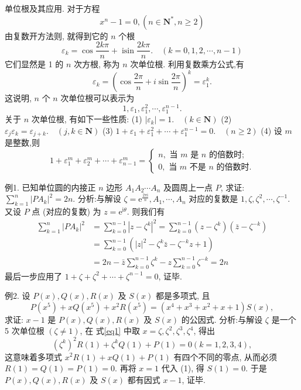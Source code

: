 
单位根及其应用.
对于方程
$$
x^n-1=0,\left(n \in \mathbf{N}^*, n \geqslant 2\right)
$$
由复数开方法则, 就得到它的 $n$ 个根
$$
\varepsilon_k=\cos \frac{2 k \pi}{n}+\operatorname{isin} \frac{2 k \pi}{n} . \quad(k=0,1,2, \cdots, n-1)
$$
它们显然是 1 的 $n$ 次方根, 称为 $n$ 次单位根.
利用复数乘方公式,有
$$
\varepsilon_k=\left(\cos \frac{2 \pi}{n}+i \sin \frac{2 \pi}{n}\right)^k=\varepsilon_1^k .
$$
这说明, $n$ 个 $n$ 次单位根可以表示为
$$
1, \varepsilon_1, \varepsilon_1^2, \cdots, \varepsilon_1^{n-1} .
$$
关于 $n$ 次单位根, 有如下一些性质:
(1) $\left|\varepsilon_k\right|=1 . \quad(k \in \mathbf{N})$
(2) $\varepsilon_j \varepsilon_k=\varepsilon_{j+k} . \quad(j, k \in \mathbf{N})$
(3) $1+\varepsilon_1+\varepsilon_1^2+\cdots+\varepsilon_1^{n-1}=0 . \quad(n \geqslant 2)$
(4) 设 $m$ 是整数,则
$$
1+\varepsilon_1^m+\varepsilon_2^m+\cdots+\varepsilon_{n-1}^m=\left\{\begin{array}{l}
n, \text { 当 } m \text { 是 } n \text { 的倍数时; } \\
0, \text { 当 } m \text { 不是 } n \text { 的倍数时.
}
\end{array}\right.
$$



例1. 已知单位圆的内接正 $n$ 边形 $A_1 A_2 \cdots A_n$ 及圆周上一点 $P$, 求证: $\sum_{k=1}^n\left|P A_k\right|^2=2 n$.
分析:与解设 $\zeta=\mathrm{e}^{\frac{2 \pi \mathrm{i}}{n}}, A_1, \cdots, A_n$ 对应的复数是 $1, \zeta, \zeta^2, \cdots, \zeta^{-1}$. 又设 $P$ 点 (对应的复数) 为 $z=\mathrm{e}^{\mathrm{i} \theta}$. 则我们有
$$
\begin{aligned}
\sum_{k=1}^n\left|P A_k\right|^2 & =\sum_{k=0}^{n-1}\left|z-\zeta^k\right|^2=\sum_{k=0}^{n-1}\left(z-\zeta^k\right)\left(\bar{z}-\zeta^{-k}\right) \\
& =\sum_{k=0}^{n-1}\left(|z|^2-\zeta^k \bar{z}-\zeta^{-k} z+1\right) \\
& =2 n-\bar{z} \sum_{k=0}^{n-1} \zeta^k-z \sum_{k=0}^{n-1} \zeta^{-k}=2 n
\end{aligned}
$$
最后一步应用了 $1+\zeta+\zeta^2+\cdots+\zeta^{n-1}=0$, 证毕.



例2. 设 $P(x), Q(x), R(x)$ 及 $S(x)$ 都是多项式, 且
$$
P\left(x^5\right)+x Q\left(x^5\right)+x^2 R\left(x^5\right)=\left(x^4+x^3+x^2+x+1\right) S(x), \label{eq1}
$$
求证: $x-1$ 是 $P(x), Q(x), R(x)$ 及 $S(x)$ 的公因式.
分析:与解设 $\zeta$ 是一个 5 次单位根 $(\zeta \neq 1)$, 在 式\ref{eq1} 中取 $x=\zeta, \zeta^2, \zeta^3, \zeta^4$, 得出
$$
\left(\zeta^k\right)^2 R(1)+\zeta^k Q(1)+P(1)=0(k=1,2,3,4),
$$
这意味着多项式 $x^2 R(1)+x Q(1)+P(1)$ 有四个不同的零点, 从而必须 $R(1)=Q(1)=P(1)=0$.
再将 $x=1$ 代入 (1), 得 $S(1)=0$.
于是 $P(x), Q(x), R(x)$ 及 $S(x)$ 都有因式 $x-1$, 证毕.



